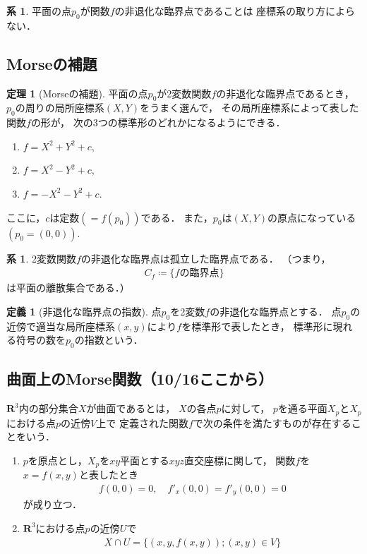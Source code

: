 \documentclass[11pt, a4paper, dvipdfmx]{jsarticle}
\theoremstyle{definition}
\newcommand{\rr}{\mathbf{R}}
\theoremstyle{mystyle}
\newtheorem{DFN}[Axiom]{定義}
\newtheorem{THM}[Axiom]{定理}
\newtheorem{CRL}[Axiom]{系}
\numberwithin{equation}{section} %
\begin{document}
\begin{CRL}
    平面の点$p_0$が関数$f$の非退化な臨界点であることは
    座標系の取り方によらない．
\end{CRL}

\subsection{Morseの補題}

\begin{THM}[Morseの補題]
    平面の点$p_0$が2変数関数$f$の非退化な臨界点であるとき，
    $p_0$の周りの局所座標系$(X,Y)$をうまく選んで，
    その局所座標系によって表した関数$f$の形が，
    次の3つの標準形のどれかになるようにできる．
    \begin{enumerate}[label=(\roman*)]
        \item $f=X^2+Y^2+c$,
        \item $f=X^2-Y^2+c$,
        \item $f=-X^2-Y^2+c$.
    \end{enumerate}
    ここに，$c$は定数$(=f(p_0))$である．
    また，$p_0$は$(X,Y)$の原点になっている$(p_0=(0,0))$.
\end{THM}

\begin{CRL}
    2変数関数$f$の非退化な臨界点は孤立した臨界点である．
    （つまり，
    \begin{align*}
        C_f\coloneqq\{f\text{の臨界点}\}
    \end{align*}
    は平面の離散集合である．）
\end{CRL}

\begin{DFN}[非退化な臨界点の指数]
    点$p_0$を2変数$f$の非退化な臨界点とする．
    点$p_0$の近傍で適当な局所座標系$(x,y)$により$f$を標準形で表したとき，
    標準形に現れる符号の数を$p_0$の指数という．
\end{DFN}

\begin{center}
    {\Large{}}    
\end{center}
\subsection{曲面上のMorse関数（10/16ここから）}

$\rr^3$内の部分集合$X$が曲面であるとは，
$X$の各点$p$に対して，
$p$を通る平面$X_p$と$X_p$における点$p$の近傍$V$上で
定義された関数$f$で次の条件を満たすものが存在することをいう．
\begin{enumerate}[label=(\roman*)]
    \item $p$を原点とし，$X_p$を$xy$平面とする$xyz$直交座標に関して，
    関数$f$を$x=f(x,y)$と表したとき
    \begin{align*}
        f(0,0)=0,\quad f'_x(0,0)=f'_y(0,0)=0
    \end{align*}
    が成り立つ．
    \item $\rr^3$における点$p$の近傍$U$で
    \begin{align*}
        X\cap U=\{(x,y,f(x,y)); (x,y)\in V\}
    \end{align*}
\end{enumerate}
\end{document}
